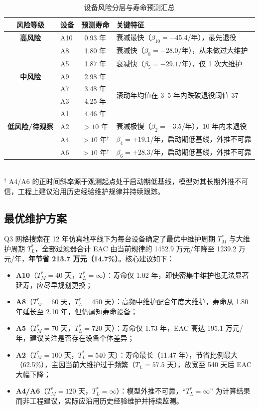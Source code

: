 \documentclass[12pt, a4paper, fontset=fandol]{ctexart}
\theoremstyle{definition}
\begin{document}
\begin{table}[H]
\centering
\caption{设备风险分层与寿命预测汇总}
\label{tab:risk_tiers}
\small
\begin{tabular}{clcl}
\toprule
风险等级 & 设备 & 预测寿命 & 关键特征 \\
\midrule
\textbf{高风险} & A10 & 0.93 年 & 衰减最快（$\beta_{10}=-45.4$/年），最先退役 \\
                 & A8  & 1.80 年 & 衰减快（$\beta_8=-28.0$/年），从未做过大维护 \\
                 & A5  & 1.87 年 & 衰减快（$\beta_5=-29.1$/年），仅 1 次大维护 \\
\midrule
\textbf{中风险} & A9  & 2.98 年 & \multirow{4}{*}{滚动年均值在 3--5 年内跌破退役阈值 37} \\
                 & A7  & 3.48 年 & \\
                 & A3  & 4.25 年 & \\
                 & A1  & 4.46 年 & \\
\midrule
\textbf{低风险/待观察} & A2  & $>10$ 年 & 衰减极慢（$\beta_2=-3.5$/年），10 年内未退役 \\
                        & A4  & $>10$ 年$^\dagger$ & $\beta_4=+19.1$/年，启动期低基线，外推不可靠 \\
                        & A6  & $>10$ 年$^\dagger$ & $\beta_6=+28.3$/年，启动期低基线，外推不可靠 \\
\bottomrule
\end{tabular}
\\[0.3em]
\footnotesize $^\dagger$ A4/A6 的正时间斜率源于观测起点处于启动期低基线，模型对其长期外推不可信，工程上建议沿用历史经验维护规律并持续跟踪。
\end{table}

\subsection{最优维护方案}

Q3 网格搜索在 12 年仿真地平线下为每台设备确定了最优中维护周期 $T_M^*$ 与大维护周期 $T_L^*$，全部过滤器合计 EAC 由当前规律的 1452.9 万元/年降至 1239.2 万元/年，\textbf{年节省 213.7 万元（14.7\%）}。核心建议如下：

\begin{itemize}[leftmargin=2em]
  \item \textbf{A10}（$T_M^*=40$ 天，$T_L^*=\infty$）：寿命仅 1.02 年，即使密集中维护也无法显著延寿，应尽早规划更换；
  \item \textbf{A8}（$T_M^*=60$ 天，$T_L^*=450$ 天）：高频中维护配合年度大维护，寿命从 1.80 年延长至 2.10 年，但仍属短寿命设备；
  \item \textbf{A5}（$T_M^*=70$ 天，$T_L^*=720$ 天）：寿命仅 1.73 年，EAC 高达 195.1 万元/年，建议关注是否存在设备个体差异；
  \item \textbf{A2}（$T_M^*=100$ 天，$T_L^*=540$ 天）：寿命最长（11.47 年），节省比例最大（62.5\%），主因当前大维护过于频繁（$T_L=57.5$ 天），放宽至 540 天后 EAC 大幅下降；
  \item \textbf{A4/A6}（$T_M^*=120$ 天，$T_L^*=\infty$）：模型外推不可靠，``$T_L^*=\infty$'' 为计算结果而非工程建议，实际应沿用历史经验维护并持续监测。
\end{itemize}
\end{document}
